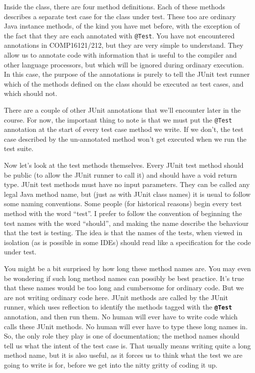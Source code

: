 \documentclass[
]{book}
\begin{document}
Inside the class, there are four method definitions. Each of these methods describes a separate test case for the class under test. These too are ordinary Java instance methods, of the kind you have met before, with the exception of the fact that they are each annotated with \texttt{@Test}. You have not encountered annotations in COMP16121/212, but they are very simple to understand. They allow us to annotate code with information that is useful to the compiler and other language processors, but which will be ignored during ordinary execution. In this case, the purpose of the annotations is purely to tell the JUnit test runner which of the methods defined on the class should be executed as test cases, and which should not.

There are a couple of other JUnit annotations that we'll encounter later in the course. For now, the important thing to note is that we must put the \texttt{@Test} annotation at the start of every test case method we write. If we don't, the test case described by the un-annotated method won't get executed when we run the test suite.

Now let's look at the test methods themselves. Every JUnit test method should be public (to allow the JUnit runner to call it) and should have a void return type. JUnit test methods must have no input parameters. They can be called any legal Java method name, but (just as with JUnit class names) it is usual to follow some naming conventions. Some people (for historical reasons) begin every test method with the word ``test''. I prefer to follow the convention of beginning the test names with the word ``should'', and making the name describe the behaviour that the test is testing. The idea is that the names of the tests, when viewed in isolation (as is possible in some IDEs) should read like a specification for the code under test.

You might be a bit surprised by how long these method names are. You may even be wondering if such long method names can possibly be best practice. It's true that these names would be too long and cumbersome for ordinary code. But we are not writing ordinary code here. JUnit methods are called by the JUnit runner, which uses reflection to identify the methods tagged with the \textbf{\texttt{@Test}} annotation, and then run them. No human will ever have to write code which calls these JUnit methods. No human will ever have to type these long names in. So, the only role they play is one of documentation; the method names should tell us what the intent of the test case is. That usually means writing quite a long method name, but it is also useful, as it forces us to think what the test we are going to write is for, before we get into the nitty gritty of coding it up.
\end{document}
